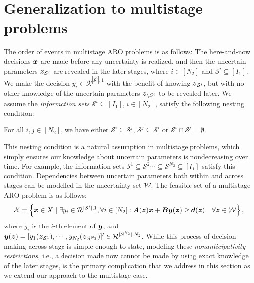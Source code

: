 \documentclass[fleqn,mnsc,blindrev]{informs4}
\newcommand{\mb}[1]{\mbox{\boldmath \ensuremath{#1}}}
\begin{document}
\section{Generalization to multistage problems} \label{sec:multi}	
	The order of events in multistage ARO problems is as follows: The here-and-now decisions $\mb{x}$ are made before any uncertainty is realized, and then the uncertain parameters $\mb{z}_{\mathcal{S}^i}$ are revealed in the later stages, where $i\in [N_2]$ and $\mathcal{S}^i\subseteq [I_1]$. We make the decision $y_i \in \mathcal{R}^{|\mathcal{S}^i|,1}$ with the benefit of knowing $\mb{z}_{\mathcal{S}^i}$, but with no other knowledge of the uncertain parameters $\mb{z}_{\setminus \mathcal{S}^i}$ to be revealed later. We assume the {\em information sets} $\mathcal{S}^i\subseteq [I_1]$, $i\in [N_2]$, satisfy the following nesting condition: 
	\begin{definition}
		For all $i,j \in [N_2]$, we have either $\mathcal{S}^i \subseteq \mathcal{S}^j$, $\mathcal{S}^j \subseteq \mathcal{S}^i$ or $\mathcal{S}^i \cap \mathcal{S}^j = \emptyset$.
	\end{definition}
	This nesting condition is a natural assumption in multistage problems, which simply ensures our knowledge about uncertain parameters is nondecreasing over time. For example, the information sets $\mathcal{S}^1 \subseteq \mathcal{S}^2 \cdots \subseteq \mathcal{S}^{N_2}\subseteq [I_1]$ satisfy this condition.	Dependencies between uncertain parameters both within and across stages can be modelled in the uncertainty set $\mathcal{W}$. The feasible set of a multistage ARO problem is as follows:
\begin{equation} \label{set:Xm}
	\mathcal{X} = \left\{ \mb{x} \in X \hspace{3pt} | \hspace{3pt}  \exists y_i \in \mathcal{R}^{|\mathcal{S}^i|,1}, \forall i\in [N_2]: \mb{A}(\mb{z})\mb{x}+\mb{B}\mb{y}(\mb{z}) \geq\mb{d}(\mb{z})  \quad  \forall \mb{z} \in \mathcal{W} \right\},
\end{equation}
	where $y_i$ is the $i$-th element of $\mb{y}$, and $\mb{y}(\mb{z}) = [y_1(\mb{z}_{\mathcal{S}^1}), \cdots, y_{N_2} (\mb{z}_{\mathcal{S}^{N_2}})]' \in \mathcal{R}^{|\mathcal{S}^{N_2}|,N_2}$. While this process of decision making across stage is simple enough to state, modeling these \textit{nonanticipativity restrictions}, i.e., a decision made now cannot be made by using exact knowledge of the later stages, is the primary complication that we address in this section as we extend our approach to the multistage case. 
	
\end{document}
